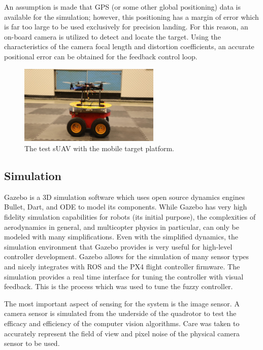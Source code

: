 An assumption is made that GPS (or some other global positioning) data is available for the simulation;
however, this positioning has a margin of error which is far too large to be used exclusively for precision
landing. For this reason, an on-board camera is utilized to detect and locate the target. Using the
characteristics of the camera focal length and distortion coefficients, an accurate positional error can be
obtained for the feedback control loop. 

\begin{figure}[ht!]
    \centering
    \includegraphics[width=0.6\textwidth]{images/irols.jpg}
    \caption{The test sUAV with the mobile target platform.}\label{f:lezl-olli}
\end{figure}

\subsection{Simulation}
Gazebo is a 3D simulation software which uses open source dynamics engines Bullet, Dart, and ODE to model its
components. While Gazebo has very high fidelity simulation capabilities for robots (its initial purpose), the
complexities of aerodynamics in general, and multicopter physics in particular, can only be modeled with many
simplifications. Even with the simplified dynamics, the simulation environment that Gazebo provides is very
useful for high-level controller development. Gazebo allows for the simulation of many sensor types and nicely
integrates with ROS and the PX4 flight controller firmware. The simulation
provides a real time interface for tuning the controller with visual feedback. This is the process which was
used to tune the fuzzy controller.

The most important aspect of sensing for the system is the image sensor. A camera sensor is simulated from the
underside of the quadrotor to test the efficacy and efficiency of the computer vision algorithms. Care was
taken to accurately represent the field of view and pixel noise of the physical camera sensor to be used.



